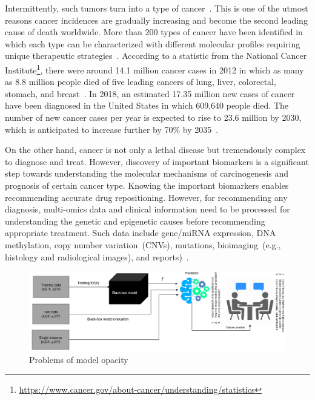 \hspace*{3.5mm} Intermittently, such tumors turn into a type of cancer~\cite{zuo2019identification,24Podolsky}. This is one of the utmost reasons cancer incidences are gradually increasing and become the second leading cause of death worldwide. More than 200 types of cancer have been identified in which each type can be characterized with different molecular profiles requiring unique therapeutic strategies~\cite{82Tomczak}. According to a statistic from the National Cancer Institute\footnote{\url{https://www.cancer.gov/about-cancer/understanding/statistics}}, there were around 14.1 million cancer cases in 2012 in which as many as 8.8 million people died of five leading cancers of lung, liver, colorectal, stomach, and breast~\cite{stat}. In 2018, an estimated 17.35 million new cases of cancer have been diagnosed in the United States in which 609,640 people died. The number of new cancer cases per year is expected to rise to 23.6 million by 2030, which is anticipated to increase further by 70\% by 2035~\cite{71Torre}. 

\hspace*{3.5mm} On the other hand, cancer is not only a lethal disease but tremendously complex to diagnose and treat. However, discovery of important biomarkers is a significant step towards understanding the molecular mechanisms of carcinogenesis and prognosis of certain cancer type. Knowing the important biomarkers enables recommending accurate drug repositioning. However, for recommending any diagnosis, multi-omics data and clinical information need to be processed for understanding the genetic and epigenetic causes before recommending appropriate treatment. Such data include gene/miRNA expression, DNA methylation, copy number variation~(CNVs), mutations, bioimaging~(e.g., histology and radiological images), and reports)~\cite{22Ding, 23Zheng}.  

\begin{figure}[h]
	\centering
	\includegraphics[width=0.9\linewidth]{images/bbm.png}
	\caption{Problems of model opacity}
    \label{fig:model_bbm}
    \vspace{-2mm}
\end{figure}

